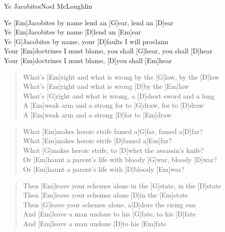 \begin{song}{Ye Jacobites}{Noel McLoughlin}

    \begin{chorus}
        Ye [Em]Jacobites by name lend an [G]ear, lend an [D]ear \\
        Ye [Em]Jacobites by name [D]lend an [Em]ear \\
        Ye [G]Jacobites by name, your [D]faults I will proclaim \\
        Your [Em]doctrines I must blame, you shall [G]hear, you shall [D]hear \\
        Your [Em]doctrines I must blame, [D]you shall [Em]hear 
    \end{chorus}

    \begin{verse}  
        What's [Em]right and what is wrong by the [G]law, by the [D]law \\
        What's [Em]right and what is wrong [D]by the [Em]law \\
        What's [G]right and what is wrong, a [D]short sword and a long \\
        A [Em]weak arm and a strong for to [G]draw, for to [D]draw \\
        A [Em]weak arm and a strong [D]for to [Em]draw 
    \end{verse}  


    \begin{verse}  
        What [Em]makes heroic strife famed a[G]far, famed a[D]far? \\
        What [Em]makes heroic strife [D]famed a[Em]far? \\
        What [G]makes heroic strife, to [D]whet the assassin's knife? \\
        Or [Em]haunt a parent's life with bloody [G]war, bloody [D]war? \\
        Or [Em]haunt a parent's life with [D]bloody [Em]war? 
    \end{verse}  


    \begin{verse}  
        Then [Em]leave your schemes alone in the [G]state, in the [D]state \\
        Then [Em]leave your schemes alone [D]in the [Em]state \\
        Then [G]leave your schemes alone, a[D]dore the rising sun \\
        And [Em]leave a man undone to his [G]fate, to his [D]fate \\
        And [Em]leave a man undone [D]to his [Em]fate 
    \end{verse}  


\end{song}
